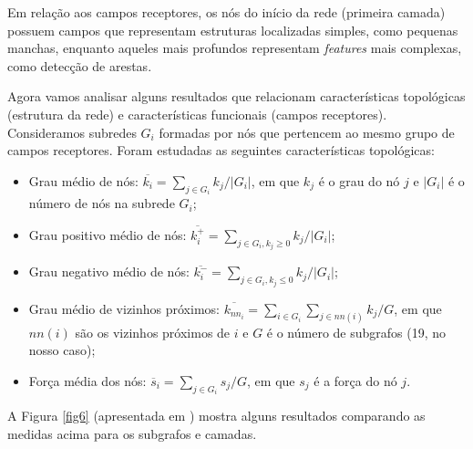 \documentclass{article}
\begin{document}
            Em relação aos campos receptores, os nós do início da rede (primeira camada) possuem campos que representam estruturas localizadas simples, como pequenas manchas,
            enquanto aqueles mais profundos representam \textit{features} mais complexas, como detecção de arestas.

            Agora vamos analisar alguns resultados que relacionam características topológicas (estrutura da rede) e características funcionais (campos receptores).
            Consideramos subredes $G_i$ formadas por nós que pertencem ao mesmo grupo de campos receptores.
            Foram estudadas as seguintes características topológicas:

            \begin{itemize}
                \item Grau médio de nós: $\overline{k_i} = \sum_{j \in G_i} k_j / |G_i|$, em que $k_j$ é o grau do nó $j$ e $|G_i|$ é o número de nós na subrede $G_i$;
                \item Grau positivo médio de nós: $\overline{k_i^+} = \sum_{j \in G_i, k_j \ge 0} k_j / |G_i|$;
                \item Grau negativo médio de nós: $\overline{k_i^-} = \sum_{j \in G_i, k_j \le 0} k_j / |G_i|$;
                \item Grau médio de vizinhos próximos: $\overline{k_{nn_i}} = \sum_{i \in G_i} \sum_{j \in nn(i)} k_j / G$, em que $nn(i)$ são os vizinhos próximos de $i$ e $G$ é o número de subgrafos (19, no nosso caso);
                \item Força média dos nós: $\overline{s}_i = \sum_{j \in G_i} s_j / G$, em que $s_j$ é a força do nó $j$.
            \end{itemize}

            A Figura \ref{fig6} (apresentada em \cite{testolin2018deep}) mostra alguns resultados comparando as medidas acima para os subgrafos e camadas.
\end{document}
